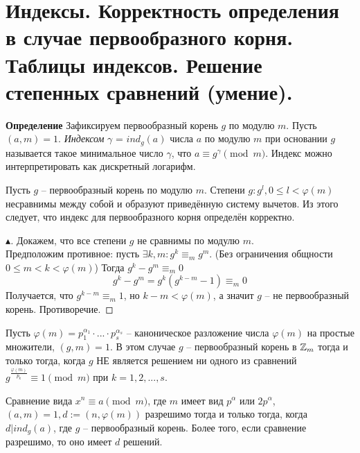 \section{Индексы. Корректность определения в случае первообразного корня. Таблицы индексов. Решение степенных сравнений (умение).}

\textbf{Определение} Зафиксируем первообразный корень $g$ по модулю $m$. Пусть $(a, m) = 1$. \textit{Индексом} $\gamma$ = $ind_g(a)$ числа $a$ по модулю $m$ при основании $g$ называется такое минимальное число $\gamma$, что $a \equiv g^{\gamma} \pmod m$. Индекс можно интерпретировать как дискретный логарифм.
\begin{theorem}
    Пусть $g$ -- первообразный корень по модулю $m$. Степени $g: g^l, 0 \leq l < \varphi(m)$ несравнимы между собой и образуют приведённую систему вычетов. Из этого следует, что индекс для первообразного корня определён корректно.
    \begin{proof}[$\blacktriangle$]
        Докажем, что все степени $g$ не сравнимы по модулю $m$.\\
        Предположим противное: пусть $\exists k, m : g^k \equiv_{m} g^m$. (Без ограничения общности $0 \leq m < k < \varphi(m)$)
        Тогда $g^k - g^m \equiv_{m} 0$\\
        $$g^k - g^m = g^k(g^{k - m} - 1) \equiv_{m} 0$$
        Получается, что $g^{k - m} \equiv_{m} 1$, но $k - m < \varphi(m)$, а значит $g$ -- не первообразный корень. Противоречие.
    \end{proof}
\end{theorem}


\begin{proposition}[б/д]
    Пусть $\varphi(m) = p_1^{\alpha_1} \cdot ... \cdot p_s^{\alpha_s}$ -- каноническое разложение числа $\varphi(m)$ на простые множители, $(g, m) = 1$. В этом случае $g$ -- первообразный корень в $\mathbb{Z}_m$ тогда и только тогда, когда $g$ НЕ является решением ни одного из сравнений $g^{\frac{\varphi(m)}{p_k}} \equiv 1 \pmod{m}$ при $k = 1, 2, ..., s$.
\end{proposition}

\begin{proposition}[б/д]
    Сравнение вида $x^n \equiv a \pmod m$, где $m$ имеет вид $p^{\alpha}$ или $2p^{\alpha}$, $(a, m) = 1, d := (n, \varphi (m))$ разрешимо тогда и только тогда, когда $d | ind_{g}(a)$, где $g$ -- первообразный корень. Более того, если сравнение разрешимо, то оно имеет $d$ решений.
\end{proposition}

